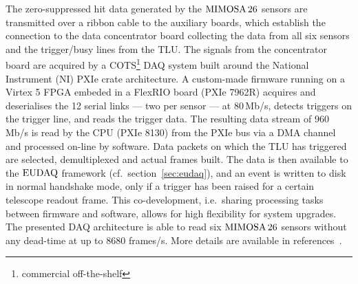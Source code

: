 The zero-suppressed hit data generated by the $\textrm{MIMOSA\,26}$ sensors are transmitted over a ribbon cable to the auxiliary boards,
 which establish the connection to the data concentrator board collecting the data from all six sensors and the trigger/busy lines from the TLU.
The signals from the concentrator board are acquired by a COTS\footnote{commercial off-the-shelf} DAQ system built around the National Instrument (NI) PXIe crate architecture. 
A custom-made firmware running on a Virtex 5 FPGA embeded in a FlexRIO board (PXIe 7962R) acquires and deserialises the 12 serial links --- two per sensor --- at 80\,Mb/s,
 detects triggers on the trigger line, and reads the trigger data. 
The resulting data stream of 960 Mb/s is read by the CPU (PXIe 8130) from the PXIe bus via a DMA channel and processed on-line by software. 
Data packets on which the TLU has triggered are selected, demultiplexed and actual frames built. 
The data is then available to the $\textrm{EUDAQ}$ framework (cf.\ section~\ref{sec:eudaq}), and an event is written to disk in normal handshake mode, only if a trigger has been raised for a certain telescope readout frame. 
This co-development, i.e.\ sharing processing tasks between firmware and software, allows for high flexibility for system upgrades. 
The presented DAQ architecture is able to read six $\textrm{MIMOSA\,26}$ sensors without any dead-time at up to 8680 frames/s.
More details are available in references~\cite{EUDET-2010-25,Claus}.
 
 
